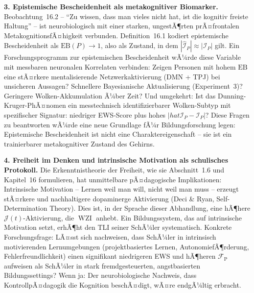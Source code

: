 ﻿\documentclass[12pt,a4paper]{report}
\theoremstyle{plain}
\theoremstyle{definition}
\theoremstyle{remark}
\DeclareMathOperator{\WZI}{WZI}
\begin{document}
	\textbf{3. Epistemische Bescheidenheit als metakognitiver Biomarker.}
	Beobachtung~16.2 -- ``Zu wissen, dass man vieles nicht hat,
	ist die kognitiv freiste Haltung'' -- ist neurobiologisch mit
	einer starken, ungestÃ¶rten prÃ¤frontalen MetakognitionsfÃ¤higkeit
	verbunden. Definition~16.1 kodiert epistemische Bescheidenheit
	als $\mathrm{EB}(P) \to 1$, also als Zustand, in dem
	$|\hat{\mathcal{I}}_P| \approx |\mathcal{I}_P|$ gilt.
	Ein Forschungsprogramm zur epistemischen Bescheidenheit
	wÃ¼rde diese Variable mit messbaren neuronalen Korrelaten verbinden:
	Zeigen Personen mit hohem $\mathrm{EB}$ eine stÃ¤rkere
	mentalisierende Netzwerkaktivierung (DMN + TPJ) bei
	unsicheren Aussagen? Schnellere Bayesianische Aktualisierung
	(Experiment~3)?
	Geringere Wolken-Akkumulation Ã¼ber Zeit?
	Und umgekehrt: Ist das Dunning-Kruger-PhÃ¤nomen ein messtechnisch
	identifizierbarer Wolken-Subtyp mit spezifischer Signatur:
	niedriger EWS-Score plus hohes $|hat{\mathcal{I}}_P - \mathcal{I}_P|$?
	Diese Fragen zu beantworten wÃ¼rde eine neue Grundlage fÃ¼r
	Bildungsforschung legen: Epistemische Bescheidenheit ist nicht
	eine Charaktereigenschaft -- sie ist ein trainierbarer
	metakognitiver Zustand des Gehirns.

	\textbf{4. Freiheit im Denken und intrinsische Motivation als
		schulisches Protokoll.}
	Die Erkenntnistheorie der Freiheit, wie sie Abschnitt~1.6
	und Kapitel~16 formulieren, hat unmittelbare pÃ¤dagogische
	Implikationen: Intrinsische Motivation -- Lernen weil man will,
	nicht weil man muss -- erzeugt stÃ¤rkere und nachhaltigere
	dopaminerge Aktivierung (Deci \& Ryan, Self-Determination Theory).
	Dies ist, in der Sprache dieser Abhandlung, eine hÃ¶here
	$\mathcal{J}(t)$-Aktivierung, die $\WZI$ anhebt.
	Ein Bildungssystem, das auf intrinsische Motivation setzt,
	erhÃ¶ht den TLI seiner SchÃ¼ler systematisch.
	Konkrete Forschungsfrage: LÃ¤sst sich nachweisen, dass SchÃ¼ler
	in intrinsisch motivierenden Lernumgebungen (projektbasiertes
	Lernen, AutonomiefÃ¶rderung, Fehlerfreundlichkeit) einen
	signifikant niedrigeren EWS und hÃ¶heren $\mathcal{F}_{\mathrm{P}}$
	aufweisen als SchÃ¼ler in stark fremdgesteuerten, angstbasierten
	Bildungssettings?
	Wenn ja: Der neurobiologische Nachweis, dass KontrollpÃ¤dagogik
	die Kognition beschÃ¤digt, wÃ¤re endgÃ¼ltig erbracht.
\end{document}

